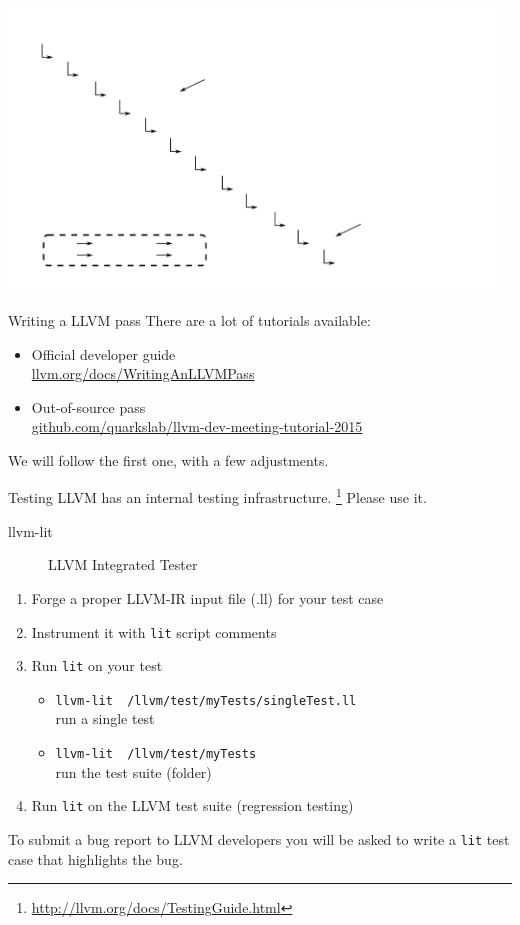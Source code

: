 \documentclass[10pt,mathserif]{beamer}
\begin{document}
\begin{frame}
	\noindent\hspace{-1.2cm}\includegraphics[width=13cm]{img/toolchain}
\end{frame}

\begin{frame}{Writing a LLVM pass}
	There are a lot of tutorials available:
	\vfill
	\begin{itemize}
		\item Official developer guide\\ \href{http://llvm.org/docs/WritingAnLLVMPass.html}{\url{llvm.org/docs/WritingAnLLVMPass}}
		\vfill
		\item Out-of-source pass\\ \href{https://github.com/quarkslab/llvm-dev-meeting-tutorial-2015}{\url{github.com/quarkslab/llvm-dev-meeting-tutorial-2015}}
	\end{itemize}
	\vfill
	We will follow the first one, with a few adjustments.
\end{frame}

\begin{frame}{Testing}
LLVM has an internal testing infrastructure. \footnote{\url{http://llvm.org/docs/TestingGuide.html}}
Please use it.
\\
\begin{description}
	\item[llvm-lit] LLVM Integrated Tester
\end{description}
\begin{enumerate}
	\item Forge a proper LLVM-IR input file (.ll) for your test case
	\item Instrument it with \texttt{lit} script comments
	\item Run \texttt{lit} on your test
		\begin{itemize}
			\item \texttt{llvm-lit ~/llvm/test/myTests/singleTest.ll}\\ run a single test
			\item \texttt{llvm-lit ~/llvm/test/myTests}\\ run the test suite (folder)
		\end{itemize}
	\item Run \texttt{lit} on the LLVM test suite (regression testing)
\end{enumerate}
\vfill
To submit a bug report to LLVM developers you will be asked to write a \texttt{lit} test case that highlights the bug.
\end{frame}
\end{document}

